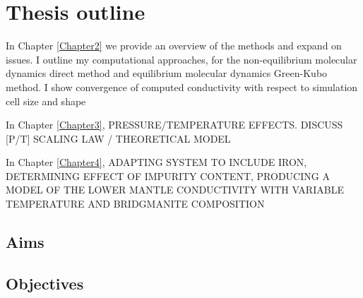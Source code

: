 \section{Thesis outline}
In Chapter \ref{Chapter2} we provide an overview of the methods and expand on issues. I outline my computational approaches, for the non-equilibrium molecular dynamics direct method and equilibrium molecular dynamics Green-Kubo method. I show convergence of computed conductivity with respect to simulation cell size and shape 

In Chapter \ref{Chapter3}, PRESSURE/TEMPERATURE EFFECTS. DISCUSS [P/T] SCALING LAW / THEORETICAL MODEL

In Chapter \ref{Chapter4}, ADAPTING SYSTEM TO INCLUDE IRON, DETERMINING EFFECT OF IMPURITY CONTENT, PRODUCING A MODEL OF THE LOWER MANTLE CONDUCTIVITY WITH VARIABLE TEMPERATURE AND BRIDGMANITE COMPOSITION

\subsection{Aims}

\subsection{Objectives}


